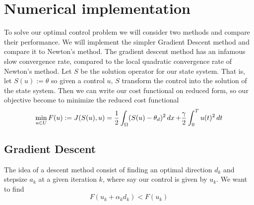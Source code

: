 \section{Numerical implementation}
To solve our optimal control problem we will consider two methods and compare their performance. We will implement the simpler Gradient Descent method and compare it to Newton's method. The gradient descent method has an infamous slow convergence rate, compared to the local quadratic convergence rate of Newton's method. Let $S$ be the solution operator for our state system. That is, let $S(u):=\theta$ so given a control $u$, $S$ transform the control into the solution of the state system. Then we can write our cost functional on reduced form, so our objective become to minimize the reduced cost functional 
\begin{equation}
\label{eq:optimization_prob}
    \min_{u \in U}F(u) := J(S(u),u) = \frac{1}{2}\int_{\Omega}(S(u) - \theta_d)^2 \mathop{dx}+ \frac{\gamma}{2}\int_0^Tu(t)^2\mathop{dt}
\end{equation}


\subsection{Gradient Descent}
The idea of a descent method consist of finding an optimal direction $d_k$ and stepsize $a_k$ at a given iteration $k$, where say our control is given by $u_k$. We want to find
\begin{equation*}
    F(u_k + \alpha_kd_k) < F(u_k)
\end{equation*}

